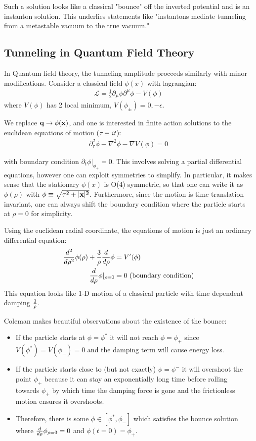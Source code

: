 \documentclass[11pt]{scrartcl}
\begin{document}
Such a solution looks like a classical "bounce" off the inverted potential and is an instanton solution.  This underlies statements like "instantons mediate tunneling from a metastable vacuum to the true vacuum."

\subsection{Tunneling in Quantum Field Theory}
In Quantum field theory, the tunneling amplitude proceeds similarly with minor modifications.  Consider a classical field $\phi(x)$ with lagrangian:
\begin{align}
	\mathcal{L} = \frac12 \partial_\mu \phi \partial^\mu \phi - V(\phi)
	\end{align}
where $V(\phi)$ has 2 local minimum, $V(\phi_{\pm}) = 0, -\epsilon$.

We replace $\bf{q} \rightarrow \phi(x)$, and one is interested in finite action solutions to the euclidean equations of motion ($\tau \equiv it$):
\begin{align}
	\partial_\tau^2 \phi - \nabla^2 \phi - \nabla V(\phi) = 0
	\end{align}

with boundary condition $\partial_t \phi |_{\phi_{+}} = 0$.  This involves solving a partial differential equations, however one can exploit symmetries to simplify.  In particular, it makes sense that the stationary $\phi(x)$ is O(4) symmetric, so that one can write it as $\phi(\rho)$ with $\phi \equiv \sqrt{\tau^2 + |\bf{x}|^2}$.  Furthermore, since the motion is time translation invariant, one can always shift the boundary condition where the particle starts at $\rho = 0$ for simplicity.

Using the euclidean radial coordinate, the equations of motion is just an ordinary differential equation:
\begin{align}
	{d^2 \over d \rho^2} \phi(\rho) + {3 \over \rho} {d \over d \rho} \phi  &= V'(\phi) \\
	{d \over d \rho} \phi|_{\rho = 0} & = 0 \text{  (boundary condition)} \\
	\end{align}
This equation looks like 1-D motion of a classical particle with time dependent damping ${3 \over \rho}$.

Coleman makes beautiful observations about the existence of the bounce:
\begin{itemize}
	\item  If the particle starts at $\phi = \phi^*$ it will not reach $\phi = \phi_+$ since $V(\phi^*) = V(\phi_+) = 0$ and the damping term will cause energy loss.
	\item If the particle starts close to (but not exactly) $\phi = \phi^-$ it will overshoot the point $\phi_+$ because it can stay an exponentially long time before rolling towards $\phi_+$ by which time the damping force is gone and the frictionless motion ensures it overshoots.
	\item Therefore, there is some $\phi \in [\phi^*, \phi_-]$ which satisfies the bounce solution where ${d \over d \rho} \phi_{\rho = 0} = 0$ and $\phi(t=0) = \phi_+$.
	\end{itemize}
\end{document}
